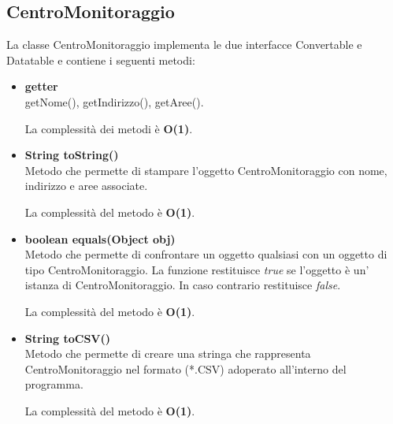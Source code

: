 \documentclass[a4paper, 12pt]{scrreprt}
\begin{document}
			\subsection{CentroMonitoraggio}
			La classe CentroMonitoraggio implementa le due interfacce Convertable e Datatable e contiene i seguenti metodi:
			\begin{itemize}
				\item \textbf{getter}
				\\getNome(), getIndirizzo(), getAree().
				
				La complessit\`a dei metodi è \textbf{O(1)}.
				
				\item \textbf{String toString()}
				\\Metodo che permette di stampare l'oggetto CentroMonitoraggio con nome, indirizzo e aree associate.
				
				La complessit\`a del metodo è \textbf{O(1)}.
				
				\item \textbf{boolean equals(Object obj)}
				\\Metodo che permette di confrontare un oggetto qualsiasi con un oggetto di tipo CentroMonitoraggio. La funzione restituisce \textit{true} se l'oggetto \`e un' istanza di CentroMonitoraggio. In caso contrario restituisce \textit{false}.
				
				La complessit\`a del metodo è \textbf{O(1)}.
				
				\item \textbf{String toCSV()}
				\\Metodo che permette di creare una stringa che rappresenta CentroMonitoraggio nel formato (*.CSV) adoperato all'interno del programma.
				
				La complessit\`a del metodo è \textbf{O(1)}.
				
			\end{itemize}
\end{document}
